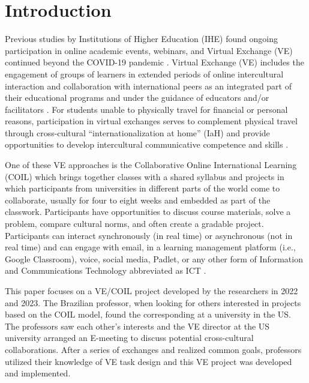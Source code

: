 \section{Introduction}\label{sec-intro}

Previous studies by Institutions of Higher Education (IHE) found ongoing
participation in online academic events, webinars, and Virtual Exchange
(VE) continued beyond the COVID-19 pandemic \cite{bowen2021virtual,garces2020upscaling,woicolesco2022internationalization}. Virtual
Exchange (VE) includes the engagement of groups of learners in extended
periods of online intercultural interaction and collaboration with
international peers as an integrated part of their educational programs
and under the guidance of educators and/or facilitators \cite[p.~1]{garces2020upscaling}. For students unable to physically travel for financial or
personal reasons, participation in virtual exchanges serves to
complement physical travel through cross-cultural \enquote{internationalization
at home} (IaH) and provide opportunities to develop intercultural
communicative competence and skills \cite{beelen2015redefining}.

One of these VE approaches is the Collaborative Online International
Learning (COIL) which brings together classes with a shared syllabus and
projects in which participants from universities in different parts of
the world come to collaborate, usually for four to eight weeks and
embedded as part of the classwork. Participants have opportunities to
discuss course materials, solve a problem, compare cultural norms, and
often create a gradable project. Participants can interact synchronously
(in real time) or asynchronous (not in real time) and can engage with
email, in a learning management platform (i.e., Google Classroom),
voice, social media, Padlet, or any other form of Information and
Communications Technology abbreviated as ICT \cite{odowd2018telecollaboration}.

This paper focuses on a VE/COIL project developed by the researchers in
2022 and 2023. The Brazilian professor, when looking for others
interested in projects based on the COIL model, found the corresponding
at a university in the US. The professors saw each
other’s interests and the VE director at the US
university arranged an E-meeting to discuss potential cross-cultural
collaborations. After a series of exchanges and realized common goals,
professors utilized their knowledge of VE task design \cite{kurek2017task} and this VE project was developed and implemented.

